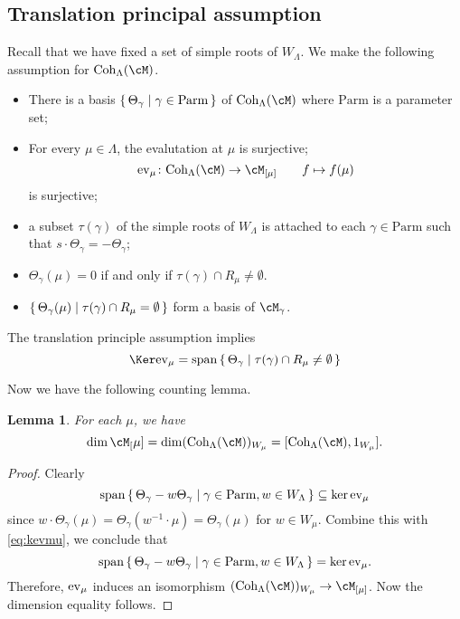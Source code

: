 \documentclass[12pt,a4paper]{amsart}
\numberwithin{equation}{section}
\newtheorem{lem}[thm]{Lemma}
\theoremstyle{remark}
\DeclareMathOperator{\sspan}{span}
\begin{document}
\def\Parm{\mathrm{Parm}}
\def\cof{\Theta}
\subsection*{Translation principal assumption}
Recall that we have fixed a set of simple roots of $W_\Lambda$. 
We make the following assumption for $\Coh_\Lambda(\cM)$. 
\begin{itemize}
\item There is a basis $\set{\cof_\gamma|\gamma\in \Parm}$ of
$\Coh_\Lambda(\cM)$ where $\Parm$ is a parameter set; 
\item For every $\mu\in \Lambda$, the evalutation at $\mu$ is surjective;  
  \[
    \ev{\mu}\colon \Coh_\Lambda(\cM)\rightarrow \cM_{[\mu]} \qquad f\mapsto f(\mu)    
  \] 
  is surjective; 
\item a subset $\tau(\gamma)$ of the simple roots of $W_\Lambda$ is attached 
to each $\gamma\in \Parm$ such that $s\cdot \cof_\gamma = - \cof_\gamma$;  
\item $\cof_\gamma(\mu) =0$ if and only if $\tau(\gamma)\cap R_\mu \neq \emptyset$. 
\item $\set{\cof_\gamma(\mu)| \tau(\gamma)\cap R_\mu = \emptyset}$ form a basis of 
$\cM_\gamma$. 
\end{itemize}

The translation principle assumption 
implies 
\begin{equation}\label{eq:kevmu}
  \Ker\ev{\mu} = \sspan\set{{\cof}_{\gamma}|\tau(\gamma)\cap R_\mu \neq \emptyset } %
\end{equation}


\def\cohm{\Coh_\Lambda(\cM)}
Now we have the following counting lemma. 
\begin{lem}
 For each $\mu$, we have
 \[
    \dim \cM_[\mu]  = \dim (\cohm)_{W_\mu} = [\cohm, 1_{W_\mu}]. 
 \]  
\end{lem}
\begin{proof}
  Clearly 
  \[
  \sspan\set{\cof_\gamma - w\cof_\gamma | \gamma\in \Parm, w\in W_\Lambda} \subseteq \ker \ev{\mu} 
  \]
  since $w\cdot \cof_\gamma(\mu) = \cof_\gamma(w^{-1}\cdot \mu)=\cof_\gamma(\mu)$ for $w\in W_\mu$. 
  Combine this with \eqref{eq:kevmu}, we conclude that 
  \[
   \sspan\set{\cof_\gamma - w\cof_\gamma | \gamma\in \Parm, w\in W_\Lambda} = \ker \ev{\mu}.  
  \] 
  Therefore, ${\mathrm{ev}_{\mu}}$ induces an isomorphism $(\cohm)_{W_\mu}\rightarrow \cM_{[\mu]}$.  
  Now the dimension equality follows. 
\end{proof}
\end{document}
